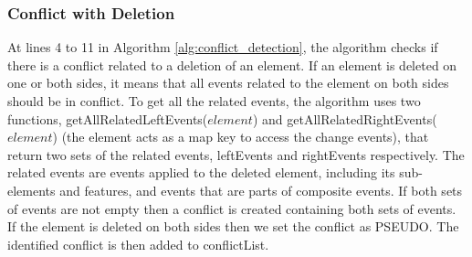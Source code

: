\subsubsection{Conflict with Deletion} 
\label{sec:delete_conflict} 
At lines 4 to 11 in Algorithm \ref{alg:conflict_detection}, the algorithm checks if there is a conflict related to a deletion of an element.
If an element is deleted on one or both sides, it means that all events related to the element on both sides should be in conflict. 
To get all the related events, the algorithm uses two functions,  \textsf{getAllRelatedLeftEvents($element$)} and \textsf{getAllRelatedRightEvents($element$)} (the element acts as a map key to access the change events), that return two sets of the related events, 
\textsf{leftEvents} and \textsf{rightEvents} respectively. The related events are events applied to the deleted element, including its sub-elements and features, 
and events that are parts of composite events. If both sets of events are not empty then a conflict is created containing both sets of events. 
If the element is deleted on both sides then we set the conflict as \textsf{PSEUDO}. The identified conflict is then added to \textsf{conflictList}.


